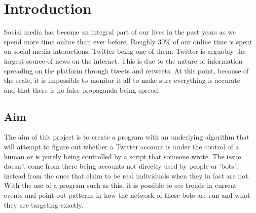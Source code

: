
\chapter{Introduction} %

\label{Chapter1} %

Social media has become an integral part of our lives in the past years as we spend more time online than ever before. Roughly 30\% of our online time is spent on social media interactions, Twitter being one of them. %
Twitter is arguably the largest source of news on the internet. This is due to the nature of information spreading on the platform through tweets and retweets. At this point, because of the scale, it is impossible to monitor it all to make sure everything is accurate and that there is no false propaganda being spread. 

\section{Aim}
The aim of this project is to create a program with an underlying algorithm that will attempt to figure out whether a Twitter account is under the control of a human or is purely being controlled by a script that someone wrote. The issue doesn't come from there being accounts not directly used by people or 'bots', instead from the ones that claim to be real individuals when they in fact are not. With the use of a program such as this, it is possible to see trends in current events and point out patterns in how the network of these bots are run and what they are targeting exactly.

